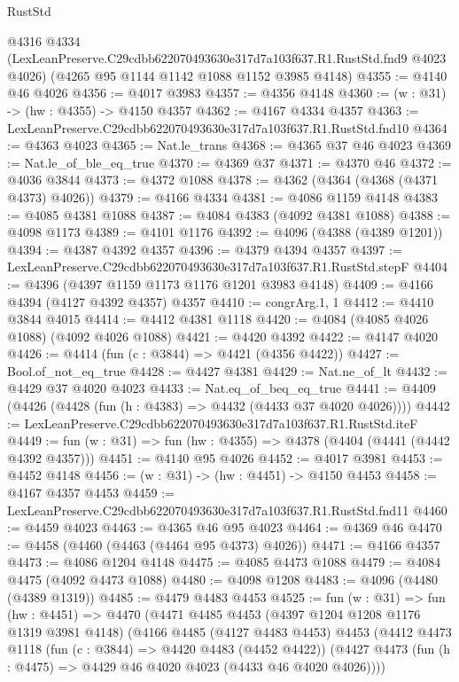 \begin{lexlean}{RustStd}
\begin{coremodule}
    @4316
    @4334
    (LexLeanPreserve.C29cdbb622070493630e317d7a103f637.R1.RustStd.fnd9 @4023 @4026)
    (@4265 @95 @1144 @1142 @1088 @1152 @3985 @4148)
@4355 := @4140 @46 @4026
@4356 := @4017 @3983
@4357 := @4356 @4148
@4360 := (w : @31) -> (hw : @4355) -> @4150 @4357
@4362 := @4167 @4334 @4357
@4363 := LexLeanPreserve.C29cdbb622070493630e317d7a103f637.R1.RustStd.fnd10
@4364 := @4363 @4023
@4365 := Nat.le_trans
@4368 := @4365 @37 @46 @4023
@4369 := Nat.le_of_ble_eq_true
@4370 := @4369 @37
@4371 := @4370 @46
@4372 := @4036 @3844
@4373 := @4372 @1088
@4378 := @4362 (@4364 (@4368 (@4371 @4373) @4026))
@4379 := @4166 @4334
@4381 := @4086 @1159 @4148
@4383 := @4085 @4381 @1088
@4387 := @4084 @4383 (@4092 @4381 @1088)
@4388 := @4098 @1173
@4389 := @4101 @1176
@4392 := @4096 (@4388 (@4389 @1201))
@4394 := @4387 @4392 @4357
@4396 := @4379 @4394 @4357
@4397 := LexLeanPreserve.C29cdbb622070493630e317d7a103f637.R1.RustStd.stepF
@4404 := @4396 (@4397 @1159 @1173 @1176 @1201 @3983 @4148)
@4409 := @4166 @4394 (@4127 @4392 @4357) @4357
@4410 := congrArg.{1, 1}
@4412 := @4410 @3844 @4015
@4414 := @4412 @4381 @1118
@4420 := @4084 (@4085 @4026 @1088) (@4092 @4026 @1088)
@4421 := @4420 @4392
@4422 := @4147 @4020
@4426 := @4414 (fun (c : @3844) => @4421 (@4356 @4422))
@4427 := Bool.of_not_eq_true
@4428 := @4427 @4381
@4429 := Nat.ne_of_lt
@4432 := @4429 @37 @4020 @4023
@4433 := Nat.eq_of_beq_eq_true
@4441 := @4409 (@4426 (@4428 (fun (h : @4383) => @4432 (@4433 @37 @4020 @4026))))
@4442 := LexLeanPreserve.C29cdbb622070493630e317d7a103f637.R1.RustStd.iteF
@4449 := fun (w : @31) => fun (hw : @4355) => @4378 (@4404 (@4441 (@4442 @4392 @4357)))
@4451 := @4140 @95 @4026
@4452 := @4017 @3981
@4453 := @4452 @4148
@4456 := (w : @31) -> (hw : @4451) -> @4150 @4453
@4458 := @4167 @4357 @4453
@4459 := LexLeanPreserve.C29cdbb622070493630e317d7a103f637.R1.RustStd.fnd11
@4460 := @4459 @4023
@4463 := @4365 @46 @95 @4023
@4464 := @4369 @46
@4470 := @4458 (@4460 (@4463 (@4464 @95 @4373) @4026))
@4471 := @4166 @4357
@4473 := @4086 @1204 @4148
@4475 := @4085 @4473 @1088
@4479 := @4084 @4475 (@4092 @4473 @1088)
@4480 := @4098 @1208
@4483 := @4096 (@4480 (@4389 @1319))
@4485 := @4479 @4483 @4453
@4525 := fun (w : @31) =>
  fun (hw : @4451) =>
  @4470
    (@4471
      @4485
      @4453
      (@4397 @1204 @1208 @1176 @1319 @3981 @4148)
      (@4166
        @4485
        (@4127 @4483 @4453)
        @4453
        (@4412
          @4473
          @1118
          (fun (c : @3844) => @4420 @4483 (@4452 @4422))
          (@4427 @4473 (fun (h : @4475) => @4429 @46 @4020 @4023 (@4433 @46 @4020 @4026))))

\end{coremodule}
\end{lexlean}
